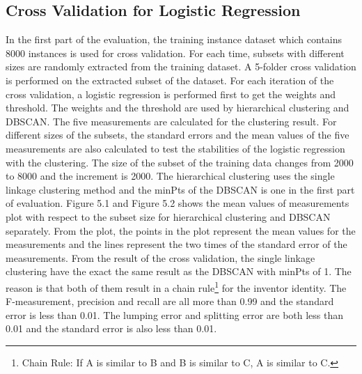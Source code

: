 \subsection{Cross Validation for Logistic Regression}
In the first part of the evaluation, the training instance dataset which contains 8000 instances is used for cross validation. For each time, subsets with different sizes are randomly extracted from the training dataset. A 5-folder cross validation is performed on the extracted subset of the dataset. For each iteration of the cross validation, a logistic regression is performed first to get the weights and threshold. The weights and the threshold are used by hierarchical clustering and DBSCAN. The five measurements are calculated for the clustering result. For different sizes of the subsets, the standard errors and the mean values of the five measurements are also calculated to test the stabilities of the logistic regression with the clustering. The size of the subset of the training data changes from 2000 to 8000 and the increment is 2000. The hierarchical clustering uses the single linkage clustering method and the minPts of the DBSCAN is one in the first part of evaluation. Figure 5.1 and Figure 5.2 shows the mean values of measurements plot with respect to the subset size for hierarchical clustering and DBSCAN separately. From the plot, the points in the plot represent the mean values for the measurements and the lines represent the two times of the standard error of the measurements. From the result of the cross validation, the single linkage clustering have the exact the same result as the DBSCAN with minPts of 1. The reason is that both of them result in a chain rule\footnote{Chain Rule: If A is similar to B and B is similar to C, A is similar to C.} for the inventor identity. The F-measurement, precision and recall are all more than 0.99 and the standard error is less than 0.01. The lumping error and splitting error are both less than 0.01 and the standard error is also less than 0.01. 

